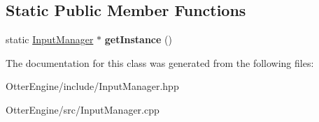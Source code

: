 \subsection*{Static Public Member Functions}
\begin{DoxyCompactItemize}
\item 
static \hyperlink{class_input_manager}{Input\+Manager} $\ast$ {\bfseries get\+Instance} ()\hypertarget{class_input_manager_a46d3d81ff275f2d791b95efa800d44ab}{}\label{class_input_manager_a46d3d81ff275f2d791b95efa800d44ab}

\end{DoxyCompactItemize}


The documentation for this class was generated from the following files\+:\begin{DoxyCompactItemize}
\item 
Otter\+Engine/include/Input\+Manager.\+hpp\item 
Otter\+Engine/src/Input\+Manager.\+cpp\end{DoxyCompactItemize}
